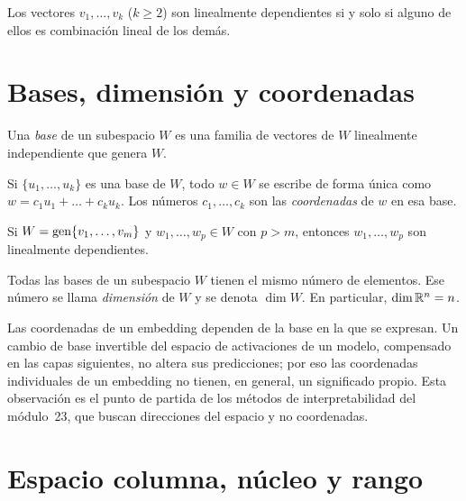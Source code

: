 \begin{proposicion}\label{prop:dependencia}
Los vectores $v_1,\dots,v_k$ ($k\ge 2$) son linealmente dependientes si y solo si alguno de ellos es combinación lineal de los demás.
\end{proposicion}

\section{Bases, dimensión y coordenadas}

\begin{definicion}[Base]
Una \emph{base} de un subespacio $W$ es una familia de vectores de $W$ linealmente independiente que genera $W$.
\end{definicion}

\begin{proposicion}[Coordenadas]\label{prop:coordenadas}
Si $\{u_1,\dots,u_k\}$ es una base de $W$, todo $w\in W$ se escribe de forma única como $w=c_1u_1+\dots+c_ku_k$. Los números $c_1,\dots,c_k$ son las \emph{coordenadas} de $w$ en esa base.
\end{proposicion}

\begin{lema}\label{lem:steinitz}
Si $W=\operatorname{gen}\{v_1,\dots,v_m\}$ y $w_1,\dots,w_p\in W$ con $p>m$, entonces $w_1,\dots,w_p$ son linealmente dependientes.
\end{lema}

\begin{teorema}[Dimensión]\label{teo:dimension}
Todas las bases de un subespacio $W$ tienen el mismo número de elementos. Ese número se llama \emph{dimensión} de $W$ y se denota $\dim W$. En particular, $\dim\mathbb{R}^{n}=n$.
\end{teorema}

\addtocounter{definicion}{1}%

\begin{observacion}
Las coordenadas de un embedding dependen de la base en la que se expresan. Un cambio de base invertible del espacio de activaciones de un modelo, compensado en las capas siguientes, no altera sus predicciones; por eso las coordenadas individuales de un embedding no tienen, en general, un significado propio. Esta observación es el punto de partida de los métodos de interpretabilidad del módulo~23, que buscan direcciones del espacio y no coordenadas.
\end{observacion}

\section{Espacio columna, núcleo y rango}

